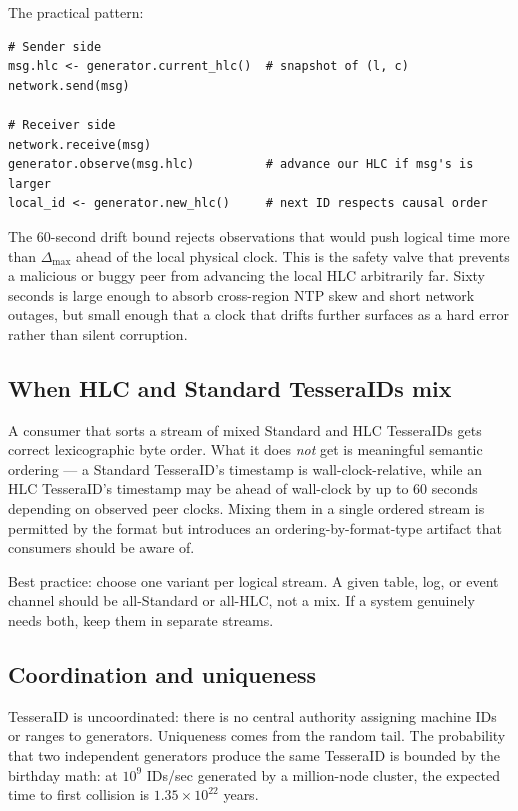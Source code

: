 The practical pattern:

\begin{lstlisting}[language=Pseudocode,caption={Plumbing HLC observation through a message-passing layer},label={lst:hlc-plumbing}]
# Sender side
msg.hlc <- generator.current_hlc()  # snapshot of (l, c)
network.send(msg)

# Receiver side
network.receive(msg)
generator.observe(msg.hlc)          # advance our HLC if msg's is larger
local_id <- generator.new_hlc()     # next ID respects causal order
\end{lstlisting}

The 60-second drift bound rejects observations that would push logical time more than $\Delta_{\max}$ ahead of the local physical clock. This is the safety valve that prevents a malicious or buggy peer from advancing the local HLC arbitrarily far. Sixty seconds is large enough to absorb cross-region NTP skew and short network outages, but small enough that a clock that drifts further surfaces as a hard error rather than silent corruption.

\subsection{When HLC and Standard TesseraIDs mix}

A consumer that sorts a stream of mixed Standard and HLC TesseraIDs gets correct lexicographic byte order. What it does \emph{not} get is meaningful semantic ordering --- a Standard TesseraID's timestamp is wall-clock-relative, while an HLC TesseraID's timestamp may be ahead of wall-clock by up to 60 seconds depending on observed peer clocks. Mixing them in a single ordered stream is permitted by the format but introduces an ordering-by-format-type artifact that consumers should be aware of.

Best practice: choose one variant per logical stream. A given table, log, or event channel should be all-Standard or all-HLC, not a mix. If a system genuinely needs both, keep them in separate streams.

\subsection{Coordination and uniqueness}

TesseraID is uncoordinated: there is no central authority assigning machine IDs or ranges to generators. Uniqueness comes from the random tail. The probability that two independent generators produce the same TesseraID is bounded by the birthday math: at $10^9$ IDs/sec generated by a million-node cluster, the expected time to first collision is $1.35 \times 10^{22}$ years.

